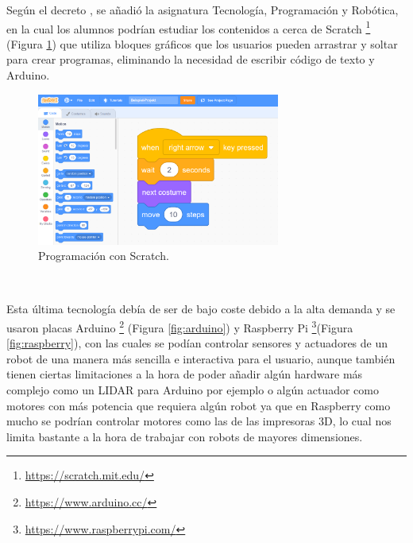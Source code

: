 Según el decreto \cite{Madrid}, se añadió la asignatura Tecnología, Programación y Robótica, en la cual los alumnos podrían estudiar los contenidos a cerca de Scratch \footnote{\url{https://scratch.mit.edu/}} (Figura \ref{fig:scratch}) que utiliza bloques gráficos que los usuarios pueden arrastrar y soltar para crear programas, eliminando la necesidad de escribir código de texto y Arduino. 

\begin{figure} [h!]
  \begin{center}
    \includegraphics[width=8cm]{figs/scratch.png}
  \end{center}
  \caption{Programación con Scratch.}
  \label{fig:scratch}
\end{figure}\

Esta última tecnología debía de ser de bajo coste debido a la alta demanda y se usaron placas Arduino \footnote{\url{https://www.arduino.cc/}} (Figura \ref{fig:arduino}) y Raspberry Pi \footnote{\url{https://www.raspberrypi.com/}}(Figura \ref{fig:raspberry}), con las cuales se podían controlar sensores y actuadores de un robot de una manera más sencilla e interactiva para el usuario, aunque también tienen ciertas limitaciones a la hora de poder añadir algún hardware más complejo como un LIDAR para Arduino por ejemplo o algún actuador como motores con más potencia que requiera algún robot ya que en Raspberry como mucho se podrían controlar motores como las de las impresoras 3D, lo cual nos limita bastante a la hora de trabajar con robots de mayores dimensiones.


